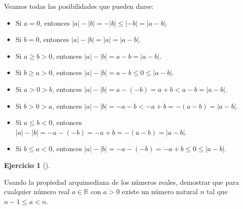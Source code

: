 \documentclass[
  a4paper,
]{scrreport}
\providecommand{\tightlist}{%
  \setlength{\itemsep}{0pt}\setlength{\parskip}{0pt}}\usepackage{longtable,booktabs,array}
\theoremstyle{definition}
\newtheorem{exercise}{Ejercicio}[chapter]
\theoremstyle{remark}
\begin{document}
\begin{tcolorbox}[enhanced jigsaw, coltitle=black, left=2mm, opacityback=0, colback=white, opacitybacktitle=0.6, breakable, colbacktitle=quarto-callout-tip-color!10!white, leftrule=.75mm, toptitle=1mm, arc=.35mm, bottomtitle=1mm, rightrule=.15mm, titlerule=0mm, title=\textcolor{quarto-callout-tip-color}{\faLightbulb}\hspace{0.5em}{Solución}, colframe=quarto-callout-tip-color-frame, toprule=.15mm, bottomrule=.15mm]

Veamos todas las posibilidades que pueden darse:

\begin{itemize}
\tightlist
\item
  Si \(a=0\), entonces \(|a|-|b|= -|b|\leq |-b| = |a-b|\).
\item
  Si \(b=0\), entonces \(|a|-|b|=|a|= |a-b|\).
\item
  Si \(a\geq b>0\), entonces \(|a|-|b|=a-b=|a-b|\).
\item
  Si \(b\geq a>0\), entonces \(|a|-|b|=a-b\leq 0\leq |a-b|\).
\item
  Si \(a>0>b\), entonces \(|a|-|b| = a-(-b) =a+b < a-b =|a-b|\).
\item
  Si \(b>0>a\), entonces \(|a|-|b| = -a-b < -a+b = -(a-b) = |a-b|\).
\item
  Si \(a\leq b<0\), entonces
  \(|a|-|b| = -a-(-b) = -a+b = -(a-b) = |a-b|\).
\item
  Si \(b\leq a<0\), entonces
  \(|a|-|b| = -a-(-b) = -a+b \leq 0 \leq |a-b|\).
\end{itemize}

\end{tcolorbox}

\leavevmode{}%
\begin{exercise}[]\label{exr-propiedad-arquimediana-1}

Usando la propiedad arquimediana de los números reales, demostrar que
para cualquier número real \(a\in\mathbb{R}\) con \(a>0\) existe un
número natural \(n\) tal que \(n-1\leq a< n\).

\end{exercise}
\end{document}
